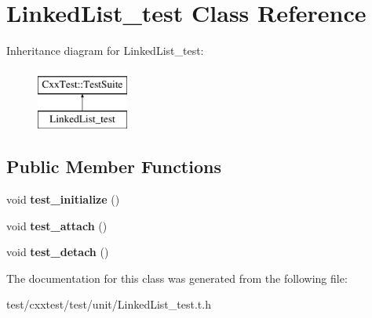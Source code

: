 \hypertarget{classLinkedList__test}{\section{Linked\-List\-\_\-test Class Reference}
\label{classLinkedList__test}
}
Inheritance diagram for Linked\-List\-\_\-test\-:\begin{figure}[H]
\begin{center}
\leavevmode
\includegraphics[height=2.000000cm]{classLinkedList__test}
\end{center}
\end{figure}
\subsection*{Public Member Functions}
\begin{DoxyCompactItemize}
\item 
\hypertarget{classLinkedList__test_a4490b56c843af2d4d792435bfdb4b9b4}{void {\bfseries test\-\_\-initialize} ()}\label{classLinkedList__test_a4490b56c843af2d4d792435bfdb4b9b4}

\item 
\hypertarget{classLinkedList__test_a5a2d09d8a2074861854a1bcac6d49f91}{void {\bfseries test\-\_\-attach} ()}\label{classLinkedList__test_a5a2d09d8a2074861854a1bcac6d49f91}

\item 
\hypertarget{classLinkedList__test_aea7da4c0eb1ea8242fe4e5d1ce150568}{void {\bfseries test\-\_\-detach} ()}\label{classLinkedList__test_aea7da4c0eb1ea8242fe4e5d1ce150568}

\end{DoxyCompactItemize}


The documentation for this class was generated from the following file\-:\begin{DoxyCompactItemize}
\item 
test/cxxtest/test/unit/Linked\-List\-\_\-test.\-t.\-h\end{DoxyCompactItemize}
